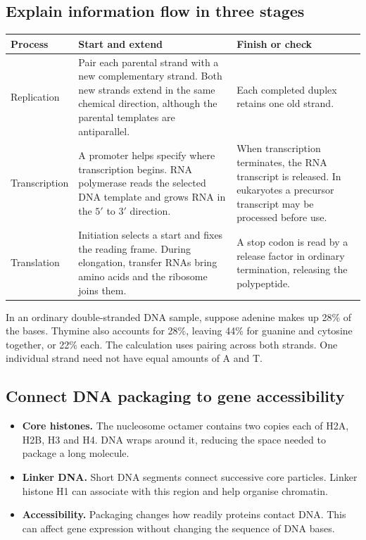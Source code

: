 \documentclass[12pt,a4paper]{article}
\begin{document}
\subsection{Explain information flow in three stages}
\par\vspace{6pt}
\noindent\begin{tabularx}{\linewidth}{|B{3.1cm}|Y|Y|}
\hline
\textbf{Process} & \textbf{Start and extend} & \textbf{Finish or check} \\ \hline
Replication & Pair each parental strand with a new complementary strand. Both new strands extend in the same chemical direction, although the parental templates are antiparallel. & Each completed duplex retains one old strand. \\ \hline
Transcription & A promoter helps specify where transcription begins. RNA polymerase reads the selected DNA template and grows RNA in the $5'$ to $3'$ direction. & When transcription terminates, the RNA transcript is released. In eukaryotes a precursor transcript may be processed before use. \\ \hline
Translation & Initiation selects a start and fixes the reading frame. During elongation, transfer RNAs bring amino acids and the ribosome joins them. & A stop codon is read by a release factor in ordinary termination, releasing the polypeptide. \\ \hline
\end{tabularx}\par

\begin{tcolorbox}[examplebox, title={Use base pairing to check DNA composition}]
In an ordinary double-stranded DNA sample, suppose adenine makes up 28\% of the bases. Thymine also accounts for 28\%, leaving 44\% for guanine and cytosine together, or 22\% each. The calculation uses pairing across both strands. One individual strand need not have equal amounts of A and T.
\end{tcolorbox}

\subsection{Connect DNA packaging to gene accessibility}
\begin{itemize}[leftmargin=*, itemsep=2pt]
  \item \textbf{Core histones.} The nucleosome octamer contains two copies each of H2A, H2B, H3 and H4. DNA wraps around it, reducing the space needed to package a long molecule.
  \item \textbf{Linker DNA.} Short DNA segments connect successive core particles. Linker histone H1 can associate with this region and help organise chromatin.
  \item \textbf{Accessibility.} Packaging changes how readily proteins contact DNA. This can affect gene expression without changing the sequence of DNA bases.
\end{itemize}
\end{document}
